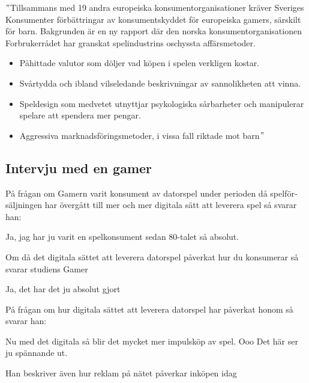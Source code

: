 \documentclass[11p]{article}
\begin{document}
\begin{otherlanguage}{swedish}
        \setlength{\leftskip}{1cm}

        \("\)Tillsammans med 19 andra europeiska konsumentorganisationer kräver Sveriges Konsumenter förbättringar av konsumentskyddet för europeiska gamers, särskilt för barn.
        Bakgrunden är en ny rapport där den norska konsumentorganisationen Forbrukerrådet har granskat spelindustrins oschyssta affärsmetoder.
        \begin{itemize}
            \item Påhittade valutor som döljer vad köpen i spelen verkligen kostar.
            \item Svårtydda och ibland vilseledande beskrivningar av sannolikheten att vinna.
            \item Speldesign som medvetet utnyttjar psykologiska sårbarheter och manipulerar spelare att spendera mer pengar.
            \item Aggressiva marknadsföringsmetoder, i vissa fall riktade mot barn\("\)\parencite{insertcoin}
        \end{itemize}
        \setlength{\leftskip}{0cm}
        
        \subsection{Intervju med en gamer}
        På frågan om Gamern varit  konsument av datorspel under perioden då spelförsäljningen har övergått till mer och mer digitala sätt att leverera spel så svarar han:

        \setlength{\leftskip}{1cm}

        Ja, jag har ju varit en spelkonsument sedan 80-talet så absolut.


        \setlength{\leftskip}{0cm}
        Om då det digitala sättet att leverera datorspel påverkat hur du konsumerar så svarar studiens Gamer

        \setlength{\leftskip}{1cm}

        Ja, det har det ju absolut gjort

        \setlength{\leftskip}{0cm}
        På frågan om hur digitala sättet att leverera datorspel har påverkat honom så svarar han:

        \setlength{\leftskip}{1cm}
        Nu med det digitala så blir det mycket mer impulsköp av spel. Ooo Det här ser ju spännande ut.


        \setlength{\leftskip}{0cm}
        Han beskriver även hur reklam på nätet påverkar inköpen idag


\end{otherlanguage}
\end{document}
